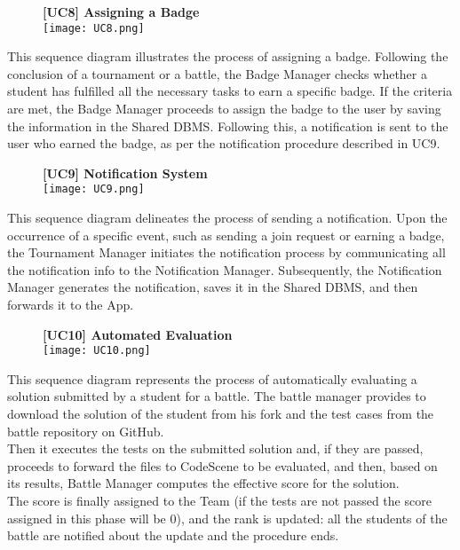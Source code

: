\documentclass{article}
\begin{document}
\begin{figure}[H]
    \centering
    \textbf{[UC8] Assigning a Badge} \\
    \texttt{[image: UC8.png]}
\end{figure}
\noindent
This sequence diagram illustrates the process of assigning a badge. Following the conclusion of a tournament or a battle, the Badge Manager checks whether a student has fulfilled all the necessary tasks to earn a specific badge. If the criteria are met, the Badge Manager proceeds to assign the badge to the user by saving the information in the Shared DBMS. Following this, a notification is sent to the user who earned the badge, as per the notification procedure described in UC9.

\begin{figure}[H]
    \centering
    \textbf{[UC9] Notification System} \\
    \texttt{[image: UC9.png]}
\end{figure}
\noindent
This sequence diagram delineates the process of sending a notification. Upon the occurrence of a specific event, such as sending a join request or earning a badge, the Tournament Manager initiates the notification process by communicating all the notification info to the Notification Manager. Subsequently, the Notification Manager generates the notification, saves it in the Shared DBMS, and then forwards it to the App.

\begin{figure}[H]
    \centering
    \textbf{[UC10] Automated Evaluation} \\
    \texttt{[image: UC10.png]}
\end{figure}
\noindent
This sequence diagram represents the process of automatically evaluating a solution submitted by a student for a battle.
The battle manager provides to download the solution of the student from his fork and the test cases from the battle repository on GitHub.\\
Then it executes the tests on the submitted solution and, if they are passed, proceeds to forward the files to CodeScene to be evaluated, and then, based on its results, Battle Manager computes the effective score for the solution.\\
The score is finally assigned to the Team (if the tests are not passed the score assigned in this phase will be 0), and the rank is updated: all the students of the battle are notified about the update and the procedure ends.
\end{document}
